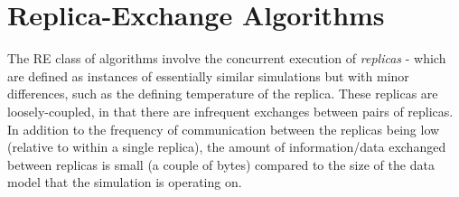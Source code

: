 \documentclass{rspublic}
\newcommand{\jhanote}[1]{ {\textcolor{red} { ***shantenu: #1 }}}
\newcommand{\alnote}[1]{ {\textcolor{blue} { ***andre: #1 }}}
\newcommand{\athotanote}[1]{ {\textcolor{green} { ***athota: #1 }}}
\newcommand{\alnote}[1]{}
\newcommand{\athotanote}[1]{}
\newcommand{\jhanote}[1]{}
\begin{document}



\section{Replica-Exchange Algorithms}\label{sec:repex-approach}

The RE class of algorithms involve the concurrent execution of
\emph{replicas} - which are defined as instances of essentially
similar simulations but with minor differences, such as the defining
temperature of the replica. These replicas are loosely-coupled, in
that there are infrequent exchanges between pairs of 
replicas. In addition to the frequency of communication between the
replicas being low (relative to within a single replica), the amount
of information/data exchanged between replicas is small (a couple of bytes) 
compared to the size of the data model that the simulation is 
operating on. 

\end{document}
